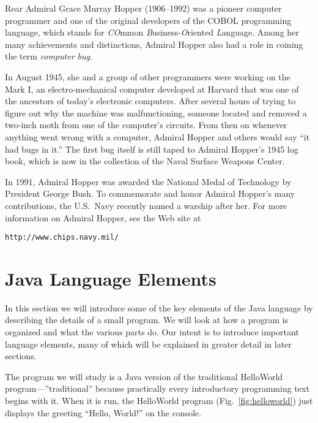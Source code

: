 {\color{cyan}Rear Admiral} Grace Murray Hopper (1906--1992) was a
pioneer computer programmer and one of the original developers of the
COBOL programming language, which stands for {\it CO}mmon {\it
B}usiness-{\it O}riented {\it L}anguage.  Among her many achievements
and distinctions, Admiral Hopper also had a role in coining the term
{\it computer bug}.

In August 1945, she and a group of other programmers were working on
the Mark I, an electro-mechanical computer developed at Harvard that
was one of the ancestors of today's electronic computers.  After
several hours of trying to figure out why the machine was
malfunctioning, someone located and removed a two-inch moth from one
of the computer's circuits.  From then on whenever anything went wrong
with a computer, Admiral Hopper and others would say ``it had bugs in
it.''  The first bug itself is still taped to Admiral Hopper's 1945
log book, which is now in the collection of the Naval Surface Weapons
Center.

In 1991, Admiral Hopper was awarded the National Medal of Technology
by President George Bush.  To commemorate and honor Admiral Hopper's
many contributions, the U.S.~Navy recently named a warship after her.
For more information on Admiral Hopper, see the Web site at

\WWWleft
\begin{jjjlisting}
\begin{lstlisting}[commentstyle=\color{black}\small]
http://www.chips.navy.mil/
\end{lstlisting}
\end{jjjlisting}


\section{Java Language Elements}

\noindent In this section we will introduce some of the key elements 
of the Java language by describing the details of a small program.  We
will look at how a program is organized and what the various parts
do. Our intent is to introduce important language elements, many of
which will be explained in greater detail in later sections.

The program we will study is a Java version of the traditional
HelloWorld program---''traditional'' because practically every
introductory programming text begins with it. When it is run, the
HelloWorld program (Fig.~\ref{fig:helloworld}) just displays the
greeting ``Hello, World!'' on the console.

